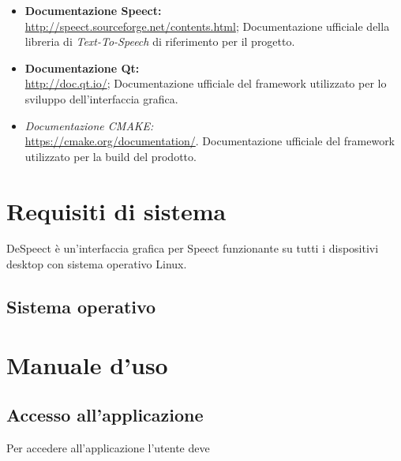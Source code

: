 \documentclass[openany,12pt,a4paper]{report}
\begin{document}
	\begin{itemize}
		\item \textbf{Documentazione Speect:} \\
		\url{http://speect.sourceforge.net/contents.html};
		\subitem Documentazione ufficiale della libreria di \textit{Text-To-Speech} di riferimento per il progetto.
		
		\item \textbf{Documentazione Qt:} \\
		\url{http://doc.qt.io/};
		\subitem Documentazione ufficiale del framework utilizzato per lo sviluppo dell'interfaccia grafica.
		
		\item \textit{Documentazione CMAKE:} \\
		\url{https://cmake.org/documentation/}.
		\subitem Documentazione ufficiale del framework utilizzato per la build del prodotto. 
	\end{itemize}

	\chapter{Requisiti di sistema}
	DeSpeect è un'interfaccia grafica per Speect funzionante su tutti i dispositivi desktop con sistema operativo Linux.
	
	\section{Sistema operativo}
	
	 
	
	\chapter{Manuale d'uso}
	
	\section{Accesso all'applicazione}
	Per accedere all'applicazione l'utente deve
	
\end{document}
